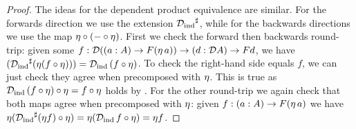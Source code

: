 \documentclass[11pt]{article}
\begin{document}
\begin{proof}
  \hspace{0pt}

  The ideas for the dependent product equivalence are similar.
  For the forwards direction we use the extension \({\mathcal{D}_\text{ind}}^\sharp\),
  while for the backwards directions we use the map
  \(\eta \circ (-\circ\eta)\).
  First we check the forward then backwards round-trip: given some
  \(f : \mathcal{D}{({{(a:A)}\to{F(\eta\,{a})}})}\to{{(d:\mathcal{D}{A})}\to{Fd}}\),
  we have
  \(
    ({\mathcal{D}_\text{ind}}^\sharp(\eta (f\circ\eta)))
    =
    \mathcal{D}_\text{ind}\,{(f\circ\eta)}
  \).
  To check the right-hand side equals \(f\), we can just check they agree
  when precomposed with \(\eta\).
  This is true as
  \(\mathcal{D}_\text{ind}\,{(f\circ\eta)}\circ\eta = f\circ\eta\)
  holds by .
  For the other round-trip we again check that both maps
  agree when precomposed with \(\eta\): given
  \(f : {{(a:A)}\to{F(\eta\,{a})}}\) we have
  \(
    \eta{({\mathcal{D}_\text{ind}}^\sharp(\eta{f})\circ\eta)}
    =
    \eta{(\mathcal{D}_\text{ind}\,{f}\circ\eta)}
    =
    \eta{f}
   \).
\end{proof}
\end{document}
